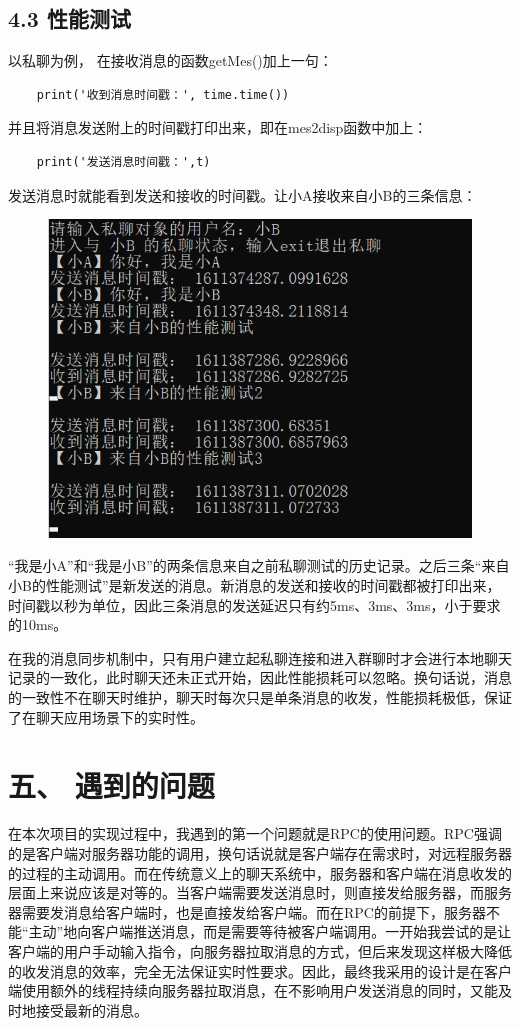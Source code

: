 \documentclass{report}
\begin{document}
\subsection*{4.3 性能测试}
以私聊为例， 在接收消息的函数getMes()加上一句：
\begin{lstlisting}
    print('收到消息时间戳：', time.time())
\end{lstlisting}
并且将消息发送附上的时间戳打印出来，即在mes2disp函数中加上：
\begin{lstlisting}
    print('发送消息时间戳：',t)
\end{lstlisting}
发送消息时就能看到发送和接收的时间戳。让小A接收来自小B的三条信息：

\begin{figure}[H]\centering
\includegraphics[scale=0.3]{pic/11.png}
\end{figure}
“我是小A”和“我是小B”的两条信息来自之前私聊测试的历史记录。之后三条“来自小B的性能测试”是新发送的消息。新消息的发送和接收的时间戳都被打印出来，时间戳以秒为单位，因此三条消息的发送延迟只有约5ms、3ms、3ms，小于要求的10ms。

在我的消息同步机制中，只有用户建立起私聊连接和进入群聊时才会进行本地聊天记录的一致化，此时聊天还未正式开始，因此性能损耗可以忽略。换句话说，消息的一致性不在聊天时维护，聊天时每次只是单条消息的收发，性能损耗极低，保证了在聊天应用场景下的实时性。

\section*{五、 遇到的问题}
在本次项目的实现过程中，我遇到的第一个问题就是RPC的使用问题。RPC强调的是客户端对服务器功能的调用，换句话说就是客户端存在需求时，对远程服务器的过程的主动调用。而在传统意义上的聊天系统中，服务器和客户端在消息收发的层面上来说应该是对等的。当客户端需要发送消息时，则直接发给服务器，而服务器需要发消息给客户端时，也是直接发给客户端。而在RPC的前提下，服务器不能“主动”地向客户端推送消息，而是需要等待被客户端调用。一开始我尝试的是让客户端的用户手动输入指令，向服务器拉取消息的方式，但后来发现这样极大降低的收发消息的效率，完全无法保证实时性要求。因此，最终我采用的设计是在客户端使用额外的线程持续向服务器拉取消息，在不影响用户发送消息的同时，又能及时地接受最新的消息。
\end{document}
